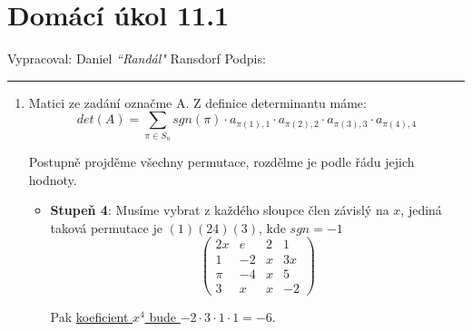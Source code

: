 \documentclass[12pt]{article}
\begin{document}
\section*{Domácí úkol 11.1}

Vypracoval: Daniel \textit{``Randál"} Ransdorf \hfill Podpis: \rule{4cm}{0.4pt}

\begin{enumerate}
  










































  \item Matici ze zadání označme A. Z definice determinantu máme:
    \[
      det(A) = \sum_{\pi \in S_n} sgn(\pi) \cdot a_{\pi(1),1} \cdot a_{\pi(2),2} \cdot a_{\pi(3),3} \cdot a_{\pi(4),4}
    \]

    Postupně projděme všechny permutace, rozdělme je podle řádu jejich hodnoty.
    \begin{itemize}
      \item \textbf{Stupeň 4}: Musíme vybrat z každého sloupce člen závislý na $x$,
        jediná taková permutace je $(1)(24)(3)$, kde $sgn=-1$
        \[
          \left(\begin{array}{cccc}
            \boxed{2x} & e & 2 & 1 \\ 1 & -2 & x & \boxed{3x} \\ \pi & -4 & \boxed{x} & 5 \\ 3 & \boxed{x} & x & -2
          \end{array}\right)
        \]

        Pak \underline{\underline{koeficient $x^4$ bude $-2\cdot3\cdot1\cdot1 = -6$}}.
      

\end{itemize}
\end{enumerate}
\end{document}
